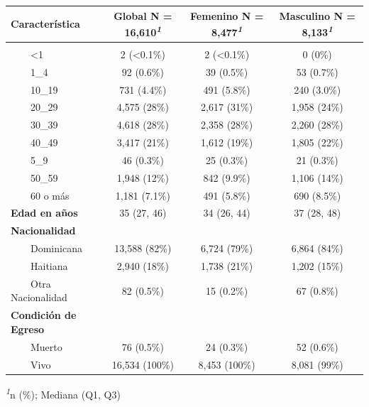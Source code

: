 \documentclass[
  letterpaper,
  DIV=11,
  numbers=noendperiod]{scrreprt}
\begin{document}
\begin{table}
\fontsize{12.0pt}{14.4pt}\selectfont
\begin{tabular*}{\linewidth}{@{\extracolsep{\fill}}lccc}
\toprule
\textbf{Característica} & \textbf{Global}  N = 16,610\textsuperscript{\textit{1}} & \textbf{Femenino}  N = 8,477\textsuperscript{\textit{1}} & \textbf{Masculino}  N = 8,133\textsuperscript{\textit{1}} \\ 
\midrule\addlinespace[2.5pt]
{\bfseries Grupo de edad en años} &  &  &  \\ 
    <1 & 2 (<0.1\%) & 2 (<0.1\%) & 0 (0\%) \\ 
    1\_4 & 92 (0.6\%) & 39 (0.5\%) & 53 (0.7\%) \\ 
    10\_19 & 731 (4.4\%) & 491 (5.8\%) & 240 (3.0\%) \\ 
    20\_29 & 4,575 (28\%) & 2,617 (31\%) & 1,958 (24\%) \\ 
    30\_39 & 4,618 (28\%) & 2,358 (28\%) & 2,260 (28\%) \\ 
    40\_49 & 3,417 (21\%) & 1,612 (19\%) & 1,805 (22\%) \\ 
    5\_9 & 46 (0.3\%) & 25 (0.3\%) & 21 (0.3\%) \\ 
    50\_59 & 1,948 (12\%) & 842 (9.9\%) & 1,106 (14\%) \\ 
    60 o más & 1,181 (7.1\%) & 491 (5.8\%) & 690 (8.5\%) \\ 
{\bfseries Edad en años} & 35 (27, 46) & 34 (26, 44) & 37 (28, 48) \\ 
{\bfseries Nacionalidad} &  &  &  \\ 
    Dominicana & 13,588 (82\%) & 6,724 (79\%) & 6,864 (84\%) \\ 
    Haitiana & 2,940 (18\%) & 1,738 (21\%) & 1,202 (15\%) \\ 
    Otra Nacionalidad & 82 (0.5\%) & 15 (0.2\%) & 67 (0.8\%) \\ 
{\bfseries Condición de Egreso} &  &  &  \\ 
    Muerto & 76 (0.5\%) & 24 (0.3\%) & 52 (0.6\%) \\ 
    Vivo & 16,534 (100\%) & 8,453 (100\%) & 8,081 (99\%) \\ 
\bottomrule
\end{tabular*}
\begin{minipage}{\linewidth}
\textsuperscript{\textit{1}}n (\%); Mediana (Q1, Q3)\\
\end{minipage}
\end{table}
\end{document}

